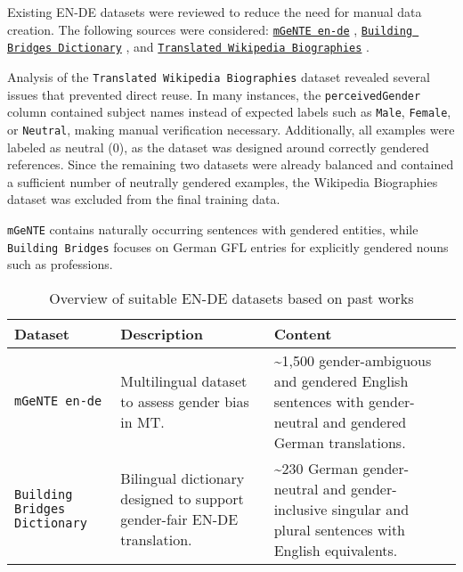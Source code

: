     Existing EN-DE datasets were reviewed to reduce the need for manual data creation. The following sources were considered: \texttt{\href{https://huggingface.co/datasets/FBK-MT/mGeNTE}{mGeNTE en-de}} \parencite{savoldiMGeNTEMultilingualResource2025}, \texttt{\href{https://github.com/g8a9/building-bridges-gender-fair-german-mt}{Building Bridges Dictionary}} \parencite{lardelliBuildingBridgesDataset2024}, and \texttt{\href{https://research.google/blog/a-dataset-for-studying-gender-bias-in-translation/}{Translated Wikipedia Biographies}} \parencite{stellaDatasetStudyingGender2021}.

    Analysis of the \texttt{Translated Wikipedia Biographies} dataset revealed several issues that prevented direct reuse. In many instances, the \texttt{perceivedGender} column contained subject names instead of expected labels such as \texttt{Male}, \texttt{Female}, or \texttt{Neutral}, making manual verification necessary. Additionally, all examples were labeled as neutral (0), as the dataset was designed around correctly gendered references. Since the remaining two datasets were already balanced and contained a sufficient number of neutrally gendered examples, the Wikipedia Biographies dataset was excluded from the final training data.

    \texttt{mGeNTE} contains naturally occurring sentences with gendered entities, while \texttt{Building Bridges} focuses on German GFL entries for explicitly gendered nouns such as professions. 

\begin{table}[ht!]
    \centering
    \renewcommand{\arraystretch}{1.3}
    \begin{tabularx}{\textwidth}{|>{\raggedright\arraybackslash}X|>{\raggedright\arraybackslash}X|>{\raggedright\arraybackslash}X|}
    \hline
    \textbf{Dataset} & \textbf{Description} & \textbf{Content} \\ \hline
    \texttt{mGeNTE en-de} \parencite{savoldiMGeNTEMultilingualResource2025} & Multilingual dataset to assess gender bias in MT. & \textasciitilde1,500 gender-ambiguous and gendered English sentences with gender-neutral and gendered German translations. \\ \hline
    \texttt{Building Bridges Dictionary} \parencite{lardelliBuildingBridgesDataset2024} & Bilingual dictionary designed to support gender-fair EN-DE translation. & \textasciitilde230 German gender-neutral and gender-inclusive singular and plural sentences with English equivalents. \\ \hline
    \end{tabularx}
    \caption{Overview of suitable EN-DE datasets based on past works}
    \label{tab:available_datasets}
\end{table}

